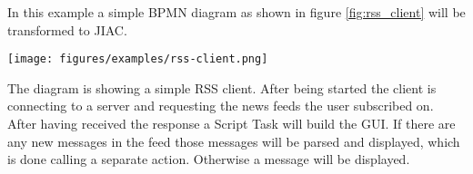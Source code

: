 % 
% 
% 
% 



In this example a simple BPMN diagram as shown in figure \ref{fig:rss_client} will be transformed to JIAC.

\begin{figure*}[htp]
\centering
\texttt{[image: figures/examples/rss-client.png]}
\caption{RSS-Client Example}
\label{fig:rss_client}
\end{figure*}

The diagram is showing a simple RSS client. After being started the client is connecting to a server and requesting the news feeds the user subscribed on. After having received the response a Script Task will build the GUI. If there are any new messages in the feed those messages will be parsed and displayed, which is done calling a separate action. Otherwise a message will be displayed.

